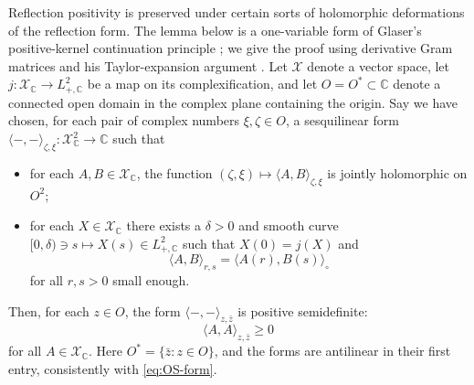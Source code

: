 \documentclass[11pt, letterpaper, reqno]{amsart}
\theoremstyle{definition}
\newenvironment{lemma}
{\pushQED{\qed}\renewcommand{\qedsymbol}{$\blacksquare$}\lemmax}
{\popQED\endlemmax}
\theoremstyle{remark}
\newcommand{\bbC}{\mathbb{C}}
\newcommand{\calX}{\mathcal{X}}
\begin{document}
Reflection positivity is preserved under certain sorts of holomorphic
deformations of the reflection form. The lemma below is a
one-variable form of Glaser's positive-kernel continuation principle
\cite[Theorem~A]{Glaser}; we give the proof using derivative Gram
matrices and his Taylor-expansion argument
\cite[\S3, p.~14]{Glaser1969}.
\begin{lemma}\label{lem:analytic-positivity}
Let $\calX$ denote a vector space, let $j:\calX_\bbC\to L^2_{+,\bbC}$
be a map on its complexification, and let $O=O^*\subset\bbC$ denote a connected
open domain in the complex plane containing the origin. Say we have
chosen, for each pair of complex numbers $\xi,\zeta\in O$, a
sesquilinear form $\langle-,-\rangle_{\zeta,\xi}:\calX_\bbC^2\to\bbC$
such that
\begin{itemize}
\item for each $A,B\in\calX_\bbC$, the function
$(\zeta,\xi)\mapsto\langle A,B\rangle_{\zeta,\xi}$ is jointly
holomorphic on $O^2$;
\item for each $X\in\calX_\bbC$ there exists a $\delta>0$ and smooth
curve $[0,\delta)\ni s\mapsto X(s)\in L^2_{+,\bbC}$ such that $X(0)=j(X)$
and
\begin{equation}
 \langle A,B\rangle_{r,s}=\langle A(r),B(s)\rangle_\circ
\end{equation}
for all $r,s>0$ small enough.
\end{itemize}
Then, for each $z\in O$, the form
$\langle-,-\rangle_{z,\bar z}$ is positive semidefinite:
\begin{equation}
 \langle A,A\rangle_{z,\bar z}\geq0
\end{equation}
for all $A\in\calX_\bbC$.
\end{lemma}
Here $O^*=\{\bar z:z\in O\}$, and the forms are antilinear in their
first entry, consistently with \eqref{eq:OS-form}.
\end{document}

